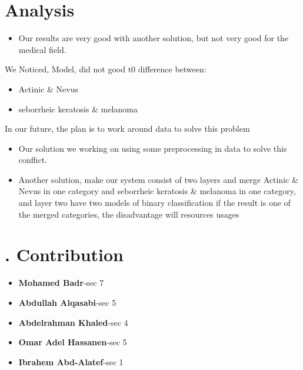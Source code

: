 \documentclass{article}
\begin{document}
	\section*{Analysis} 
	
	\begin{itemize}
		\item Our results are very good with another solution, but not very good for the medical field.	
	\end{itemize}
	We Noticed, Model, did not good t0 difference between:
	
	\begin{itemize}
		\item Actinic \& Nevus
		\item seborrheic keratosis \& melanoma
	\end{itemize}
	In our future, the plan is to work around data to solve this problem
	\begin{itemize}
		\item Our solution we working on using some preprocessing in data to solve this conflict.
		\item Another solution, make our system consist of two layers and merge Actinic \& Nevus in one category and seborrheic keratosis \& melanoma in one category, and layer two have two models of binary classification if the result is one of the merged categories, the disadvantage will resources usages
		
	\end{itemize}
	
	
	\section*{. Contribution}
		\begin{itemize}
			
			\item \textbf{Mohamed Badr}-sec 7
			\item \textbf{Abdullah Alqasabi}-sec 5 	
			\item \textbf{Abdelrahman Khaled}-sec 4 
			\item \textbf{Omar Adel Hassanen}-sec 5
			\item \textbf{Ibrahem Abd-Alatef}-sec 1
			
			
		\end{itemize}
	
	 

		
	
	
	
\end{document}
